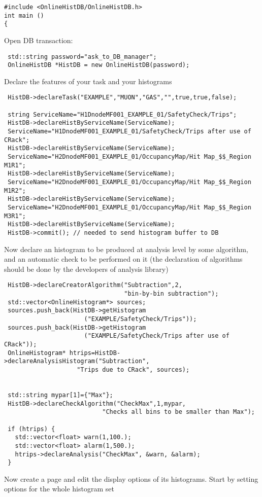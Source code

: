 \documentclass{lhcbnote}
\begin{document}
\begin{verbatim}
#include <OnlineHistDB/OnlineHistDB.h>
int main ()
{
\end{verbatim}
Open DB transaction:
\begin{verbatim}
 std::string password="ask_to_DB_manager";
 OnlineHistDB *HistDB = new OnlineHistDB(password);
\end{verbatim}
Declare the features of your task and your histograms
\begin{verbatim}
 HistDB->declareTask("EXAMPLE","MUON","GAS","",true,true,false);

 string ServiceName="H1DnodeMF001_EXAMPLE_01/SafetyCheck/Trips";
 HistDB->declareHistByServiceName(ServiceName);
 ServiceName="H1DnodeMF001_EXAMPLE_01/SafetyCheck/Trips after use of CRack";
 HistDB->declareHistByServiceName(ServiceName);
 ServiceName="H2DnodeMF001_EXAMPLE_01/OccupancyMap/Hit Map_$$_Region M1R1";
 HistDB->declareHistByServiceName(ServiceName); 
 ServiceName="H2DnodeMF001_EXAMPLE_01/OccupancyMap/Hit Map_$$_Region M1R2";
 HistDB->declareHistByServiceName(ServiceName);
 ServiceName="H2DnodeMF001_EXAMPLE_01/OccupancyMap/Hit Map_$$_Region M3R1";
 HistDB->declareHistByServiceName(ServiceName);
 HistDB->commit(); // needed to send histogram buffer to DB
\end{verbatim}
Now declare an histogram to be produced at analysis level by some
algorithm, and an automatic check to be performed on it (the
declaration of algorithms should be done by the developers of analysis
library)  
\begin{verbatim}
 HistDB->declareCreatorAlgorithm("Subtraction",2,
                                 "bin-by-bin subtraction");
 std::vector<OnlineHistogram*> sources;
 sources.push_back(HistDB->getHistogram
                      ("EXAMPLE/SafetyCheck/Trips"));
 sources.push_back(HistDB->getHistogram
                      ("EXAMPLE/SafetyCheck/Trips after use of CRack"));
 OnlineHistogram* htrips=HistDB->declareAnalysisHistogram("Subtraction",
                    "Trips due to CRack", sources);


 std::string mypar[1]={"Max"};
 HistDB->declareCheckAlgorithm("CheckMax",1,mypar,
                           "Checks all bins to be smaller than Max");
 
 if (htrips) {
   std::vector<float> warn(1,100.);
   std::vector<float> alarm(1,500.);
   htrips->declareAnalysis("CheckMax", &warn, &alarm);
 } 
\end{verbatim}
Now create a page and edit the display options of its
histograms. Start by setting options for the whole histogram set
\end{document}
